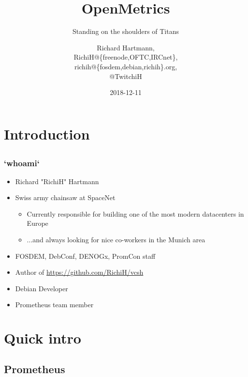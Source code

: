 \documentclass[aspectratio=169]{beamer}
\title{OpenMetrics}
\subtitle{Standing on the shoulders of Titans}
\author{Richard Hartmann,\\
RichiH@\{freenode,OFTC,IRCnet\},\\
richih@\{fosdem,debian,richih\}.org,\\
@TwitchiH}
\date{2018-12-11}
\begin{document}
\setcounter{tocdepth}{1}

\section{Introduction}

\subsection{}

\begin{frame}
	\titlepage
\end{frame}


\subsection{}

\begin{frame}
	\frametitle{`whoami`}
	\begin{itemize}
		\item Richard "RichiH" Hartmann
		\item Swiss army chainsaw at SpaceNet
		\begin{itemize}
			\item Currently responsible for building one of the most modern datacenters in Europe
			\item ...and always looking for nice co-workers in the Munich area
		\end{itemize}
		\item FOSDEM, DebConf, DENOGx, PromCon staff
		\item Author of \url{https://github.com/RichiH/vcsh}
		\item Debian Developer
		\item Prometheus team member
	\end{itemize}
\end{frame}


\section{Quick intro}

\subsection{Prometheus}
\end{document}
